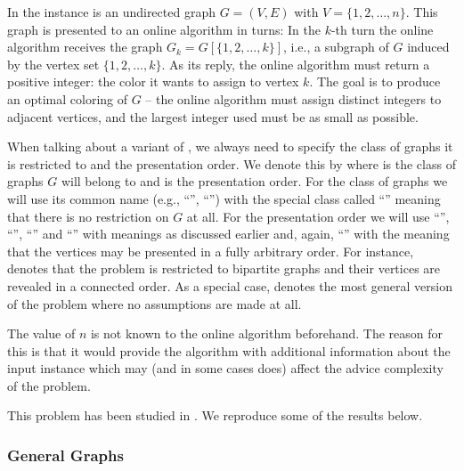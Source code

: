 \begin{definition}\label{def:graph-coloring}
    In  the instance is an undirected graph $G =
    (V, E)$ with $V = \{1, 2, \dots, n\}$. This graph is presented to an
    online algorithm in turns: In the $k$-th turn the online algorithm
    receives the graph $G_k = G[\{1, 2, \dots, k\}]$, i.e., a subgraph of
    $G$ induced by the vertex set $\{1, 2, \dots, k\}$.  As its reply, the
    online algorithm must return a positive integer: the color it wants to
    assign to vertex $k$. The goal is to produce an optimal coloring of
    $G$ -- the online algorithm must assign distinct integers to adjacent
    vertices, and the largest integer used must be as small as possible.
\end{definition}

When talking about a variant of , we always need
to specify the class of graphs it is restricted to and the presentation
order. We denote this by  where  is the class
of graphs $G$ will belong to and  is the presentation order.
For the class of graphs we will use its common name (e.g.,
``'', ``'') with the special class
called ``'' meaning that there is no restriction on $G$ at
all. For the presentation order we will use ``'',
``'', ``'' and ``'' with
meanings as discussed earlier and, again, ``'' with the
meaning that the vertices may be presented in a fully arbitrary order.
For instance,  denotes that the problem is
restricted to bipartite graphs and their vertices are revealed in a
connected order. As a special case,  denotes the most
general version of the problem where no assumptions are made at all.

The value of $n$ is not known to the online algorithm beforehand. The
reason for this is that it would provide the algorithm with additional
information about the input instance which may (and in some cases does)
affect the advice complexity of the problem.

This problem has been studied in \cite{misof-trivial-graphs, hermi}. We
reproduce some of the results below.

\subsubsection{General Graphs}


